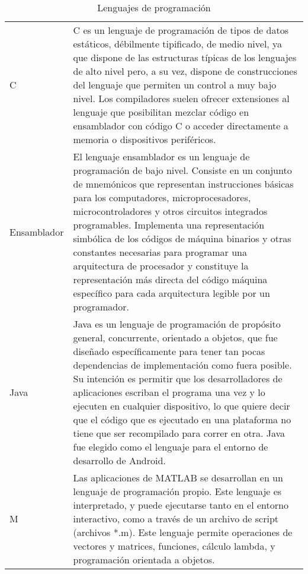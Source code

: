 \begin{table}[htbp]
	\begin{center}
		\begin{tabular}{|p{3cm}|p{12cm}|}
			\hline
			\thead{Nombre}&\thead{Descripción}\\
			\hline
			\hline
			C &  C es un lenguaje de programación de tipos de datos estáticos, débilmente tipificado, de medio nivel, ya que dispone de las estructuras típicas de los lenguajes de alto nivel pero, a su vez, dispone de construcciones del lenguaje que permiten un control a muy bajo nivel. Los compiladores suelen ofrecer extensiones al lenguaje que posibilitan mezclar código en ensamblador con código C o acceder directamente a memoria o dispositivos periféricos.\\
			\hline
			Ensamblador & El lenguaje ensamblador es un lenguaje de programación de bajo nivel. Consiste en un conjunto de mnemónicos que representan instrucciones básicas para los computadores, microprocesadores, microcontroladores y otros circuitos integrados programables. Implementa una representación simbólica de los códigos de máquina binarios y otras constantes necesarias para programar una arquitectura de procesador y constituye la representación más directa del código máquina específico para cada arquitectura legible por un programador.\\
			\hline
			Java & Java es un lenguaje de programación de propósito general, concurrente, orientado a objetos, que fue diseñado específicamente para tener tan pocas dependencias de implementación como fuera posible. Su intención es permitir que los desarrolladores de aplicaciones escriban el programa una vez y lo ejecuten en cualquier dispositivo, lo que quiere decir que el código que es ejecutado en una plataforma no tiene que ser recompilado para correr en otra.
			Java fue elegido como el lenguaje para el entorno de desarrollo de Android.\\
			\hline
			M & Las aplicaciones de MATLAB se desarrollan en un lenguaje de programación propio. Este lenguaje es interpretado, y puede ejecutarse tanto en el entorno interactivo, como a través de un archivo de script (archivos *.m). Este lenguaje permite operaciones de vectores y matrices, funciones, cálculo lambda, y programación orientada a objetos.\\
			\hline
		\end{tabular}
		\caption{Lenguajes de programación}
		\label{disenoEstructura:lenguajes}
	\end{center}
\end{table}

